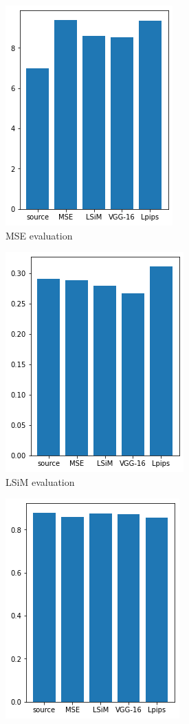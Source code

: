 \documentclass[a4paper,12pt,twoside]{report}
\begin{document}
\begin{figure}
\begin{subfigure}{0.32\textwidth}
			\centering
			\includegraphics[scale=0.49]{buoyancy_low/mse_eval.png}
			\caption{MSE evaluation}
		\end{subfigure}
		\begin{subfigure}{0.32\textwidth}
			\centering
			\includegraphics[scale=0.49]{buoyancy_low/lsim_eval.png}
			\caption{LSiM evaluation}
		\end{subfigure}
		\begin{subfigure}{0.32\textwidth}
			\centering
			\includegraphics[scale=0.49]{buoyancy_low/ssim.png}

\end{subfigure}
\end{figure}
\end{document}
